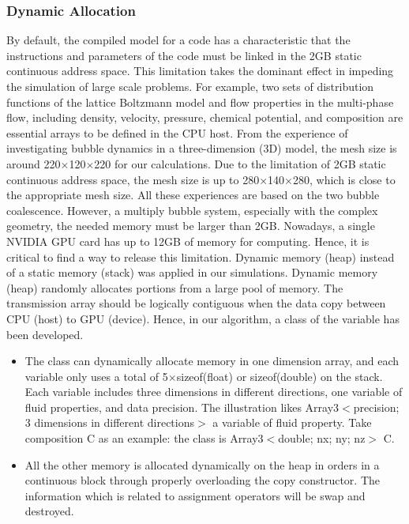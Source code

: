 \documentclass[10pt]{elsarticle}
\begin{document}
\subsubsection{Dynamic Allocation} 
By default, the compiled model for a code has a characteristic that the instructions and parameters of the code must be linked in the 2GB static continuous address space. This limitation takes the dominant effect in impeding the simulation of large scale problems. For example, two sets of distribution functions of the lattice Boltzmann model and flow properties in the multi-phase flow, including density, velocity, pressure, chemical potential, and composition are essential arrays to be defined in the CPU host. From the experience of investigating bubble dynamics in a three-dimension (3D) model, the mesh size is around 220$\times$120$\times$220 for our calculations. Due to the limitation of 2GB static continuous address space, the mesh size is up to 280$\times$140$\times$280, which is close to the appropriate mesh size. All these experiences are based on the two bubble coalescence. However, a multiply bubble system, especially with the complex geometry, the needed memory must be larger than 2GB.  Nowadays, a single NVIDIA GPU card has up to 12GB of memory for computing. Hence, it is critical to find a way to release this limitation. Dynamic memory (heap) instead of a static memory (stack) was applied in our simulations.
Dynamic memory (heap) randomly allocates portions from a large pool of memory. The transmission array should be logically contiguous when the data copy between CPU (host) to GPU (device). Hence, in our algorithm, a class of the variable has been developed.
\begin{itemize}
\item The class can dynamically allocate memory in one dimension array, and each variable only uses a total of 5$\times$sizeof(float) or sizeof(double) on the stack. Each variable includes three dimensions in different directions, one variable of fluid properties, and data precision. The illustration likes Array3$<$precision; 3 dimensions in different directions$>$ a variable of fluid property. Take composition C as an example: the class is Array3$<$double; nx; ny; nz$>$ C.  
\item All the other memory is allocated dynamically on the heap in orders in a continuous block through properly overloading the copy constructor. The information which is related to assignment operators will be swap and destroyed.  
\end{itemize}
\end{document}
